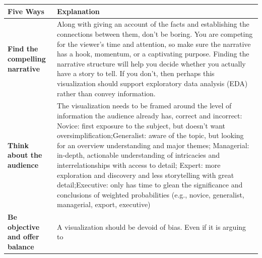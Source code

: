 \documentclass[]{book}
\theoremstyle{definition}
\theoremstyle{definition}
\theoremstyle{definition}
\theoremstyle{remark}
\begin{document}
\begin{longtable}[]{@{}ll@{}}
\toprule
\begin{minipage}[b]{0.16\columnwidth}\raggedright\strut
\textbf{Five Ways}\strut
\end{minipage} & \begin{minipage}[b]{0.78\columnwidth}\raggedright\strut
\textbf{Explanation}\strut
\end{minipage}\tabularnewline
\midrule
\endhead
\begin{minipage}[t]{0.16\columnwidth}\raggedright\strut
\textbf{Find the compelling narrative}\strut
\end{minipage} & \begin{minipage}[t]{0.78\columnwidth}\raggedright\strut
Along with giving an account of the facts and establishing the
connections between them, don't be boring. You are competing for the
viewer's time and attention, so make sure the narrative has a hook,
momentum, or a captivating purpose. Finding the narrative structure will
help you decide whether you actually have a story to tell. If you don't,
then perhaps this visualization should support exploratory data analysis
(EDA) rather than convey information.\strut
\end{minipage}\tabularnewline
\begin{minipage}[t]{0.16\columnwidth}\raggedright\strut
\textbf{Think about the audience}\strut
\end{minipage} & \begin{minipage}[t]{0.78\columnwidth}\raggedright\strut
The visualization needs to be framed around the level of information the
audience already has, correct and incorrect: Novice: first exposure to
the subject, but doesn't want oversimplification;Generalist: aware of
the topic, but looking for an overview understanding and major themes;
Managerial: in-depth, actionable understanding of intricacies and
interrelationships with access to detail; Expert: more exploration and
discovery and less storytelling with great detail;Executive: only has
time to glean the significance and conclusions of weighted probabilities
(e.g., novice, generalist, managerial, export, executive)\strut
\end{minipage}\tabularnewline
\begin{minipage}[t]{0.16\columnwidth}\raggedright\strut
\textbf{Be objective and offer balance}\strut
\end{minipage} & \begin{minipage}[t]{0.78\columnwidth}\raggedright\strut
A visualization should be devoid of bias. Even if it is arguing to

\end{minipage}
\end{longtable}
\end{document}
